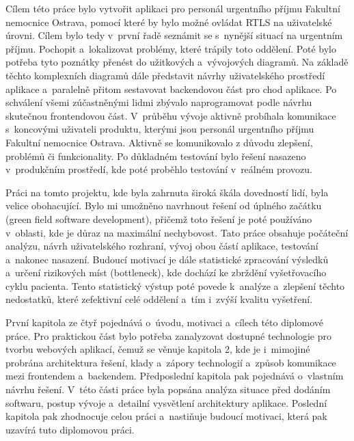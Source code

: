 Cílem této práce bylo vytvořit aplikaci pro personál urgentního příjmu Fakultní nemocnice Ostrava, pomocí které by bylo možné ovládat RTLS na uživatelské úrovni. Cílem bylo tedy v~první řadě seznámit se s~nynější situací na urgentním příjmu. Pochopit a~lokalizovat problémy, které trápily toto oddělení. Poté bylo potřeba tyto poznátky přenést do užitkových a~vývojových diagramů. Na základě těchto komplexních diagramů dále představit návrhy uživatelského prostředí aplikace a~paralelně přitom sestavovat backendovou část pro chod aplikace. Po schválení všemi zúčastněnými lidmi zbývalo naprogramovat podle návrhu skutečnou frontendovou část. V~průběhu vývoje aktivně probíhala komunikace s~koncovými uživateli produktu, kterými jsou personál urgentního příjmu Fakultní nemocnice Ostrava. Aktivně se komunikovalo z důvodu zlepšení, problémů či funkcionality. Po důkladném testování bylo řešení nasazeno v~produkčním prostředí, kde poté proběhlo testování v~reálném provozu. 

Práci na tomto projektu, kde byla zahrnuta široká škála dovedností lidí, byla velice obohacující. Bylo mi umožněno navrhnout řešení od úplného začátku (green field software development), přičemž toto řešení je poté používáno v~oblasti, kde je důraz na maximální nechybovost. Tato práce obsahuje počáteční analýzu, návrh uživatelského rozhraní, vývoj obou částí aplikace, testování a~nakonec nasazení. Budoucí motivací je dále statistické zpracování výsledků a~určení rizikových míst (bottleneck), kde dochází ke zbrždění vyšetřovacího cyklu pacienta. Tento statistický výstup poté povede k~analýze a~zlepšení těchto nedostatků, které zefektivní celé oddělení a~tím i~zvýší kvalitu vyšetření. 

První kapitola ze čtyř pojednává o~úvodu, motivaci a~cílech této diplomové práce. Pro praktickou část bylo potřeba zanalyzovat dostupné technologie pro tvorbu webových aplikací, čemuž se věnuje kapitola 2, kde je i~mimojiné probrána architektura řešení, klady a~zápory technologií a~způsob komunikace mezi frontendem a~backendem. Předposlední kapitola pak pojednává o~vlastním návrhu řešení. V~této části práce byla popsána analýza situace před dodáním softwaru, postup vývoje a~detailní vysvětlení architektury aplikace. Poslední kapitola pak zhodnocuje celou práci a~nastiňuje budoucí motivaci, která pak uzavírá tuto diplomovou práci.
